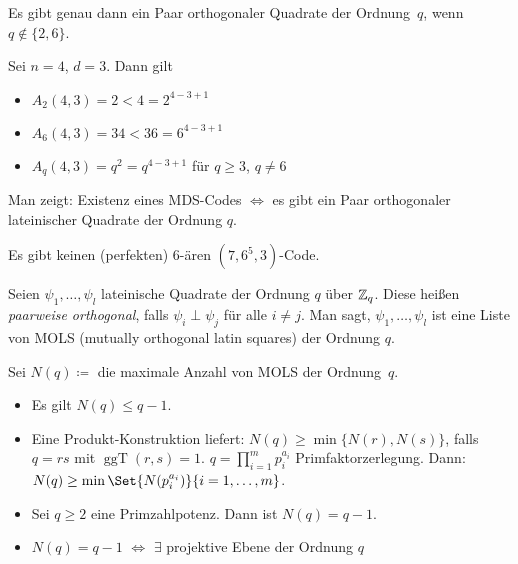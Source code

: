 \documentclass{cheat-sheet}
\DeclareMathOperator{\ggT}{ggT} %
\begin{document}
\begin{satz}
  Es gibt genau dann ein Paar orthogonaler Quadrate der Ordnung~$q$, wenn $q \not\in \{ 2, 6 \}$.
\end{satz}

\begin{satz}
  Sei $n=4$, $d=3$.
  Dann gilt
  \begin{itemize}
    \item $A_2(4, 3) = 2 < 4 = 2^{4-3+1}$
    \item $A_6(4,3) = 34 < 36 = 6^{4-3+1}$
    \item $A_q(4,3) = q^2 = q^{4-3+1}$ für $q \geq 3$, $q \neq 6$
  \end{itemize}
\end{satz}

\begin{beweisidee}
  Man zeigt: Existenz eines MDS-Codes $\iff$ es gibt ein Paar orthogonaler lateinischer Quadrate der Ordnung $q$.
\end{beweisidee}

\begin{satz}
  Es gibt keinen (perfekten) $6$-ären $(7, 6^5, 3)$-Code.
\end{satz}

\begin{defn}
  Seien $\psi_1, \ldots, \psi_l$ lateinische Quadrate der Ordnung $q$ über $\mathbb{Z}_q$.
  Diese heißen \emph{paarweise orthogonal}, falls $\psi_i \perp \psi_j$ für alle $i \neq j$.
  Man sagt, $\psi_1, \ldots, \psi_l$ ist eine Liste von MOLS (mutually orthogonal latin squares) der Ordnung $q$.
\end{defn}

\begin{bem}
  Sei $N(q) \coloneqq $ die maximale Anzahl von MOLS der Ordnung~$q$.
  \begin{itemize}
    \item Es gilt $N(q) \leq q - 1$.
    \item Eine Produkt-Konstruktion liefert: $N(q) \geq \min \{ N(r), N(s) \}$, falls $q = rs$ mit $\ggT(r, s) = 1$.
    $q = \prod_{i=1}^m p_i^{a_i}$ Primfaktorzerlegung.
    Dann: $N(q) \geq \min \Set{N(p_i^{a_i})}{i = 1, \ldots, m}$.
    \item Sei $q \geq 2$ eine Primzahlpotenz. Dann ist $N(q) = q-1$.
    \item $N(q) = q - 1$ $\iff$ $\exists$ projektive Ebene der Ordnung $q$
  \end{itemize}
\end{bem}
\end{document}
